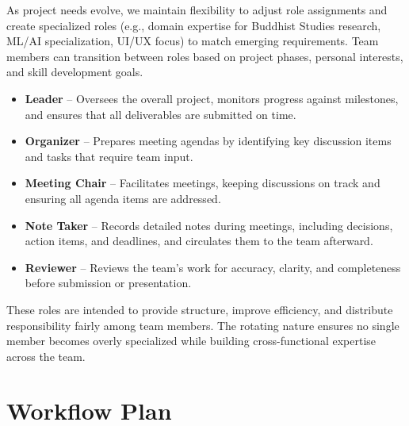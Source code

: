 \documentclass{article}
\begin{document}
As project needs evolve, we maintain flexibility to adjust role assignments and create specialized roles
(e.g., domain expertise for Buddhist Studies research, ML/AI specialization, UI/UX focus) to match
emerging requirements. Team members can transition between roles based on project phases, personal
interests, and skill development goals.

\begin{itemize}
    \item \textbf{Leader} -- Oversees the overall project, monitors progress against milestones,
    and ensures that all deliverables are submitted on time.

    \item \textbf{Organizer} -- Prepares meeting agendas by identifying key discussion items
    and tasks that require team input.

    \item \textbf{Meeting Chair} -- Facilitates meetings, keeping discussions on track
    and ensuring all agenda items are addressed.

    \item \textbf{Note Taker} -- Records detailed notes during meetings, including decisions,
    action items, and deadlines, and circulates them to the team afterward.

    \item \textbf{Reviewer} -- Reviews the team’s work for accuracy, clarity, and completeness
    before submission or presentation.
\end{itemize}

These roles are intended to provide structure, improve efficiency,
and distribute responsibility fairly among team members. The rotating nature ensures
no single member becomes overly specialized while building cross-functional expertise
across the team.



\section{Workflow Plan}
\end{document}
